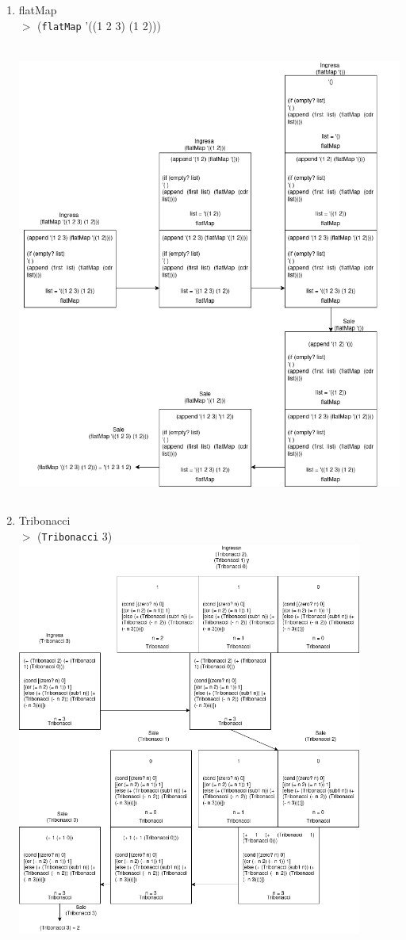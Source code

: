 \documentclass[11pt]{article}
\begin{document}
\begin{enumerate}[leftmargin=0.8cm]
\begin{enumerate}
        \item flatMap\\
        $>$ (\texttt{flatMap} '((1 2 3) (1 2)))\\\\
        \includegraphics[height=15cm]{flatmap_normal.png}
        \item Tribonacci\\
        \newpage
        $>$ (\texttt{Tribonacci} 3)\\
        \includegraphics[height=13cm]{Tribonacci_normal.png}

\end{enumerate}
\end{enumerate}
\end{document}
